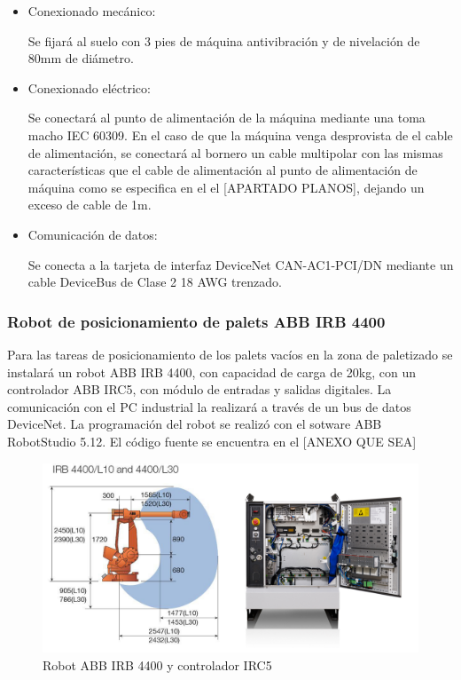 		\begin{itemize}
				\item{Conexionado mecánico:}
				
				Se fijará al suelo con 3 pies de máquina antivibración y de nivelación de 80mm de diámetro.

				\item{Conexionado eléctrico:}

				Se conectará al punto de alimentación de la máquina mediante una  toma macho IEC 60309. En el caso de que la máquina venga desprovista de el cable de alimentación, se conectará al bornero un cable multipolar con las mismas características que el cable de alimentación al punto de alimentación de máquina como se especifica en el el [APARTADO PLANOS], dejando un exceso de cable de 1m. \	
							
				\item{Comunicación de datos:}

				Se conecta a la tarjeta de interfaz DeviceNet CAN-AC1-PCI/DN mediante un cable DeviceBus de Clase 2 18 AWG trenzado.
		\end{itemize}
\newpage

	\subsubsection{Robot de posicionamiento de palets ABB IRB 4400}

	
	
	Para las tareas de posicionamiento de los palets vacíos en la zona de paletizado se instalará un robot ABB IRB 4400, con capacidad de carga de 20kg, con un controlador ABB IRC5, con módulo de entradas y salidas digitales. La comunicación con el PC industrial la realizará a través de un bus de datos DeviceNet. La programación del robot se realizó con el sotware ABB RobotStudio 5.12. El código fuente se encuentra en el [ANEXO QUE SEA]\\
	

	\begin{figure}[htp]
		
			\centering
			\includegraphics[scale=0.4]{Datasheets/9Foto.jpg}
			\caption{Robot ABB IRB 4400 y controlador IRC5}
			\label{fig:testa}
		
	\end{figure}	
	

